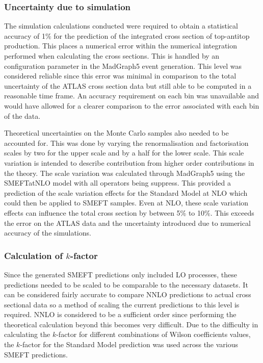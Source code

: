 \documentclass[a4paper,11pt]{article}
\begin{document}
\subsubsection{Uncertainty due to simulation}\label{sec:scale_variation}

The simulation calculations conducted were required to obtain a statistical accuracy of 1\% for the prediction of the integrated cross section of top-antitop production.
This places a numerical error within the numerical integration performed when calculating the cross sections.
This is handled by an configuration parameter in the MadGraph5 event generation.
This level was considered reliable since this error was minimal in comparison to the total uncertainty of the ATLAS cross section data but still able to be computed in a reasonable time frame.
An accuracy requirement on each bin was unavailable and would have allowed for a clearer comparison to the error associated with each bin of the data.

Theoretical uncertainties on the Monte Carlo samples also needed to be accounted for.
This was done by varying the renormalisation and factorisation scales by two for the upper scale and by a half for the lower scale.
This scale variation is intended to describe contribution from higher order contributions in the theory.
The scale variation was calculated through MadGraph5 using the SMEFTatNLO model with all operators being suppress.
This provided a prediction of the scale variation effects for the Standard Model at NLO which could then be applied to SMEFT samples.
Even at NLO, these scale variation effects can influence the total cross section by between 5\% to 10\%.
This exceeds the error on the ATLAS data and the uncertainty introduced due to numerical accuracy of the simulations.

\subsubsection{Calculation of \texorpdfstring{$k$}{k}-factor}
Since the generated SMEFT predictions only included LO processes, these predictions needed to be scaled to be comparable to the necessary datasets.
It can be considered fairly accurate to compare NNLO predictions to actual cross sectional data so a method of scaling the current predictions to this level is required.
NNLO is considered to be a sufficient order since performing the theoretical calculation beyond this becomes very difficult.
Due to the difficulty in calculating the $k$-factor for different combinations of Wilson coefficients values, the $k$-factor for the Standard Model prediction was used across the various SMEFT predictions.
\end{document}
